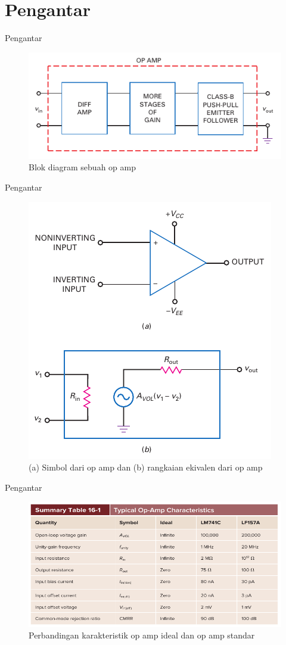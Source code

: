 \section{Pengantar}
\begin{frame}{Pengantar}
\begin{figure}
	\centering
	\includegraphics[width=0.7\linewidth]{gambar/fig-16.01}
	\caption{Blok diagram sebuah op amp}
	\label{fig-16.01}
\end{figure}
\end{frame}

\begin{frame}{Pengantar}
	\begin{figure}
		\centering
		\includegraphics[width=0.4\linewidth]{gambar/fig-16.02}
		\caption{(a) Simbol dari op amp dan (b) rangkaian ekivalen dari op amp}
		\label{fig-16.02}
	\end{figure}
\end{frame}

\begin{frame}{Pengantar}
	\begin{figure}
		\centering
		\includegraphics[width=0.8\linewidth]{gambar/tab-16.01}
		\caption{Perbandingan karakteristik op amp ideal dan op amp standar}
		\label{tab-16.01}
	\end{figure}
\end{frame}